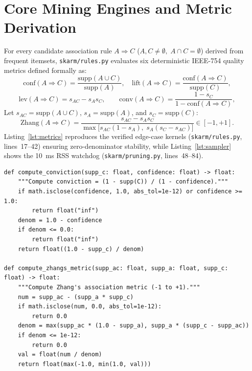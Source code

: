 \section{Core Mining Engines and Metric Derivation}
For every candidate association rule $A \Rightarrow C$ ($A, C \neq \emptyset, \; A \cap C = \emptyset$) derived from frequent itemsets, \texttt{skarm/\protect\allowbreak{}rules.py} evaluates six deterministic IEEE-754 quality metrics defined formally as:
\begin{equation}
\mathrm{conf}(A \Rightarrow C) = \frac{\mathrm{supp}(A \cup C)}{\mathrm{supp}(A)}, \quad
\mathrm{lift}(A \Rightarrow C) = \frac{\mathrm{conf}(A \Rightarrow C)}{\mathrm{supp}(C)},
\end{equation}
\begin{equation}
\mathrm{lev}(A \Rightarrow C) = s_{AC} - s_A s_C, \qquad
\mathrm{conv}(A \Rightarrow C) = \frac{1 - s_C}{1 - \mathrm{conf}(A \Rightarrow C)},
\end{equation}
Let $s_{AC}=\mathrm{supp}(A \cup C)$, $s_A=\mathrm{supp}(A)$, and $s_C=\mathrm{supp}(C)$:
\begin{equation}
\mathrm{Zhang}(A \Rightarrow C) = \frac{s_{AC} - s_A s_C}{\max\!\big[s_{AC}(1 - s_A),\; s_A(s_C - s_{AC})\big]} \in [-1, +1].
\end{equation}
Listing~\ref{lst:metrics} reproduces the verified edge-case kernels (\texttt{skarm/\protect\allowbreak{}rules.py}, lines~17--42) ensuring zero-denominator stability, while Listing~\ref{lst:sampler} shows the 10~ms RSS watchdog (\texttt{skarm/\protect\allowbreak{}pruning.py}, lines~48--84).

\begin{lstlisting}[caption={Verified Conviction and Zhang's Metric Edge-Case Implementations (\texttt{skarm/rules.py}, lines 17--41).},label={lst:metrics}]
def compute_conviction(supp_c: float, confidence: float) -> float:
    """Compute conviction = (1 - supp(C)) / (1 - confidence)."""
    if math.isclose(confidence, 1.0, abs_tol=1e-12) or confidence >= 1.0:
        return float("inf")
    denom = 1.0 - confidence
    if denom <= 0.0:
        return float("inf")
    return float((1.0 - supp_c) / denom)

def compute_zhangs_metric(supp_ac: float, supp_a: float, supp_c: float) -> float:
    """Compute Zhang's association metric (-1 to +1)."""
    num = supp_ac - (supp_a * supp_c)
    if math.isclose(num, 0.0, abs_tol=1e-12):
        return 0.0
    denom = max(supp_ac * (1.0 - supp_a), supp_a * (supp_c - supp_ac))
    if denom <= 1e-12:
        return 0.0
    val = float(num / denom)
    return float(max(-1.0, min(1.0, val)))
\end{lstlisting}

